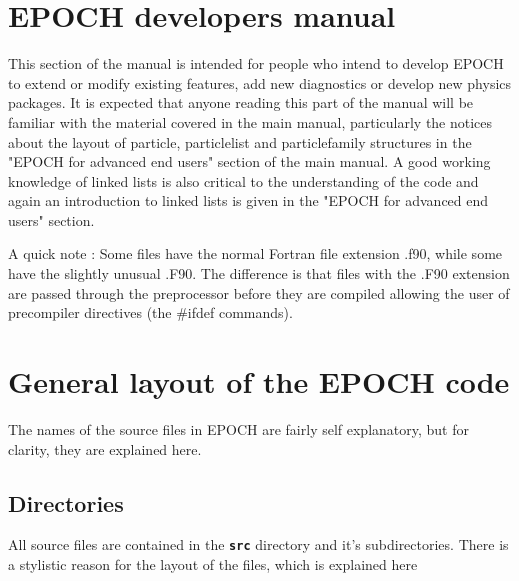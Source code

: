 \documentclass[12pt]{article}
\newcommand{\inlinecode}[1]{{\color{warwickred} \bf\texttt{#1}}}
\newcommand{\EPOCH}{{\color{warwickdark}\fontfamily{phv}\selectfont EPOCH} }
\begin{document}


\section{\EPOCH developers manual}
This section of the manual is intended for people who intend to develop \EPOCH
to extend or modify existing features, add new diagnostics or develop new
physics packages. It is expected that anyone reading this part of the manual
will be familiar with the material covered in the main manual, particularly
the notices about the layout of particle, particlelist and particlefamily
structures in the "\EPOCH for advanced end users" section of the main
manual. A good working knowledge of linked lists is also critical to the
understanding of the code and again an introduction to linked lists is given
in the "\EPOCH for advanced end users" section.

A quick note : Some files have the normal Fortran file extension .f90, while
some have the slightly unusual .F90. The difference is that files with the
.F90 extension are passed through the preprocessor before they are compiled
allowing the user of precompiler directives (the \#ifdef commands).

\section{General layout of the \EPOCH code}

The names of the source files in \EPOCH are fairly self explanatory, but for
clarity, they are explained here.

\subsection{Directories}
All source files are contained in the \inlinecode{src} directory and it's
subdirectories. There is a stylistic reason for the layout of the files, which
is explained here
\end{document}
